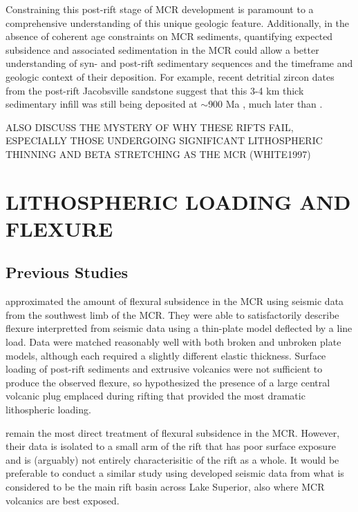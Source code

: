 \documentclass[12pt,letterpaper]{article}
\begin{document}
Constraining this post-rift stage of MCR development is paramount to a comprehensive understanding of this unique geologic feature. Additionally, in the absence of coherent age constraints on MCR sediments, quantifying expected subsidence and associated sedimentation in the MCR could allow a better understanding of syn- and post-rift sedimentary sequences and the timeframe and geologic context of their deposition. For example, recent detritial zircon dates from the post-rift Jacobsville sandstone suggest that this 3-4 km thick sedimentary infill was still being deposited at $\sim$900 Ma \citep{Craddock2013a}, much later than . \par

ALSO DISCUSS THE MYSTERY OF WHY THESE RIFTS FAIL, ESPECIALLY THOSE UNDERGOING SIGNIFICANT LITHOSPHERIC THINNING AND BETA STRETCHING AS THE MCR (WHITE1997)

\section*{LITHOSPHERIC LOADING AND FLEXURE}
\subsection*{Previous Studies}
\cite{Nyquist1988a} approximated the amount of flexural subsidence in the MCR using seismic data from the southwest limb of the MCR. They were able to satisfactorily describe flexure interpretted from seismic data using a thin-plate model deflected by a line load. Data were matched reasonably well with both broken and unbroken plate models, although each required a slightly different elastic thickness. Surface loading of post-rift sediments and extrusive volcanics were not sufficient to produce the observed flexure, so \cite{Nyquist1988a} hypothesized the presence of a large central volcanic plug emplaced during rifting that provided the most dramatic lithospheric loading.\par

\cite{Nyquist1988a} remain the most direct treatment of flexural subsidence in the MCR. However, their data is isolated to a small arm of the rift that has poor surface exposure and is (arguably) not entirely characterisitic of the rift as a whole. It would be preferable to conduct a similar study using developed seismic data \citep{Behrendt1990a} from what is considered to be the main rift basin across Lake Superior, also where MCR volcanics are best exposed.\par
\end{document}
